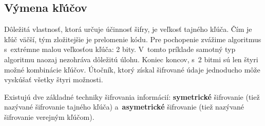\subsection{Výmena kľúčov}
Dôležitá vlastnosť, ktorá určuje účinnosť šifry, je veľkosť tajného kľúča. Čím je kľúč väčší, tým zložitejšie je prelomenie kódu. Pre pochopenie zvážime algoritmus s~extrémne malou veľkosťou kľúča: 2 bity. V~tomto príklade samotný typ algoritmu naozaj nezohráva dôležitú úlohu. Koniec koncov, s~2 bitmi sú len štyri možné kombinácie kľúčov. Útočník, ktorý získal šifrované údaje jednoducho môže vyskúšať všetky štyri možnosti.

Existujú dve základné techniky šifrovania informácií: \textbf{symetrické} šifrovanie (tiež nazývané šifrovanie tajného kľúča) a~\textbf{asymetrické} šifrovanie (tiež nazývané šifrovanie verejným kľúčom). 

